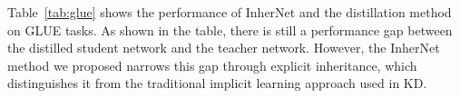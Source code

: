 \documentclass{article} %
\begin{document}





Table~\ref{tab:glue} shows the performance of InherNet and the distillation method on GLUE tasks. As shown in the table, there is still a performance gap between the distilled student network and the teacher network. However, the InherNet method we proposed narrows this gap through explicit inheritance, which distinguishes it from the traditional implicit learning approach used in KD.
\end{document}
